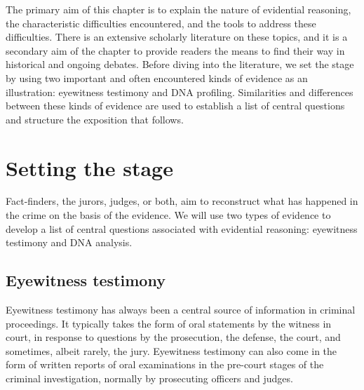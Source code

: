 \documentclass[10pt]{article}
\begin{document}
The primary aim of this chapter is to explain the nature of evidential reasoning, the characteristic difficulties encountered, and the tools to address these difficulties. There is an extensive scholarly literature on these topics, and it is a secondary aim of the chapter to provide readers the means to find their way in historical and ongoing debates. Before diving into the literature, we set the stage by using two important and often encountered kinds of evidence as an illustration: eyewitness testimony and DNA profiling. Similarities and differences between these kinds of evidence are used to establish a list of central questions and  structure the exposition that follows.


\section{Setting the stage}


Fact-finders, the jurors, judges, or both, aim to reconstruct what has happened in the crime on the basis of the evidence. 
We will use two types of evidence to develop a list of central questions associated with evidential reasoning: eyewitness testimony and DNA analysis.

\subsection{Eyewitness testimony}

Eyewitness testimony has always been a central source of information in criminal proceedings. It typically takes the form of oral statements by the witness in court, in response to questions by the prosecution, the defense, the court, and sometimes, albeit rarely, the jury. Eyewitness testimony can also come 
in the form of written reports of oral examinations in the pre-court stages of the criminal investigation, normally by prosecuting officers and judges. 
\end{document}
